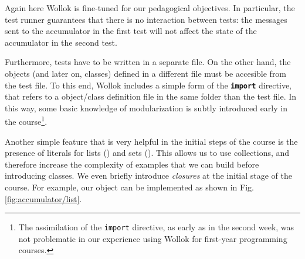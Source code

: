 Again here Wollok is fine-tuned for our pedagogical objectives.
In particular, the test runner guarantees that there is no interaction between tests: the messages sent to the accumulator in the first test will not affect the state of the accumulator in the second test.

Furthermore, tests have to be written in a separate file.
On the other hand, the objects (and later on, classes) defined in a different file must be accesible from the test file. To this end, Wollok includes a simple form of the \texttt{\textbf{import}} directive, that refers to a object/class definition file in the same folder than the test file. In this way, some basic knowledge of modularization is subtly introduced early in the course\footnote{The assimilation of the \texttt{import} directive, as early as in the second week, was not problematic in our experience using Wollok for first-year programming courses.}.


\medskip
Another simple feature that is very helpful in the initial steps of the course is the presence of literals for lists (\eg \code{[1,2,3]}) and sets (\eg {}).
This allows us to use collections, and therefore increase the complexity of examples that we can build before introducing classes.
We even briefly introduce \emph{closures} at the initial stage of the course.
For example, our  object can be implemented as shown in Fig. \ref{fig:accumulator/list}.

